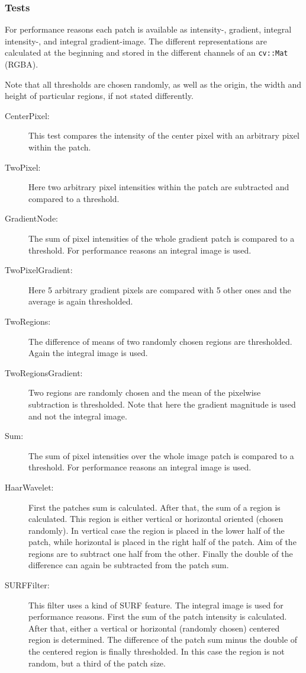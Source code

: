 \subsubsection{Tests}
For performance reasons each patch is available as intensity-, gradient, integral intensity-, and integral gradient-image. The different representations are calculated at the beginning and stored in the different channels of an \texttt{cv::Mat} (RGBA).

Note that all thresholds are chosen randomly, as well as the origin, the width and height of particular regions, if not stated differently.

\FloatBarrier
\begin{description}
\item[CenterPixel:]
This test compares the intensity of the center pixel with an arbitrary pixel within the patch.

\item[TwoPixel:]
Here two arbitrary pixel intensities within the patch are subtracted and compared to a threshold.

\item[GradientNode:]
The sum of pixel intensities of the whole gradient patch is compared to a threshold. For performance reasons an integral image is used. 

\item[TwoPixelGradient:]
Here 5 arbitrary gradient pixels are compared with 5 other ones and the average is again thresholded.

\item[TwoRegions:]
The difference of means of two randomly chosen regions are thresholded. Again the integral image is used.

\item[TwoRegionsGradient:]
Two regions are randomly chosen and the mean of the pixelwise subtraction is thresholded. Note that here the gradient magnitude is used and not the integral image.

\item[Sum:]
The sum of pixel intensities over the whole image patch is compared to a threshold. For performance reasons an integral image is used.

\item[HaarWavelet:]
First the patches sum is calculated. After that, the sum of a region is calculated. This region is either vertical or horizontal oriented (chosen randomly). In vertical case the region is placed in the lower half of the patch, while horizontal is placed in the right half of the patch. Aim of the regions are to subtract one half from the other. Finally the double of the difference can again be subtracted from the patch sum.

\item[SURFFilter:]
This filter uses a kind of SURF feature. The integral image is used for performance reasons. First the sum of the patch intensity is calculated. After that, either a vertical or horizontal (randomly chosen) centered region is determined. The difference of the patch sum minus the double of the centered region is finally thresholded. In this case the region is not random, but a third of the patch size.
\end{description}




